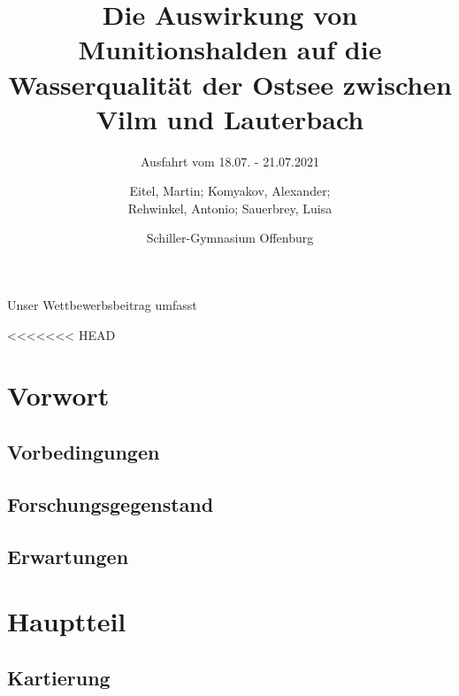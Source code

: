 \documentclass[12pt,titlepage]{scrreprt}
\begin{document}
% 
\begin{titlepage}

	

\title{Die Auswirkung von Munitionshalden auf die Wasserqualität der Ostsee zwischen Vilm und Lauterbach}
\subtitle{Ausfahrt vom 18.07. - 21.07.2021}
\titlehead{\centering\texttt{[image: Bilder/DSC05220]}}


\author{Eitel, Martin; Komyakov, Alexander; \\ Rehwinkel, Antonio; Sauerbrey, Luisa\\ \and Schiller-Gymnasium Offenburg}

\publishers{Wissenschaftspate: Prof Dr. Jens Greinert \texttt{jgreinert@geomar.de} \\
\vspace*{2ex} Betreuer: Marek Czernohous \texttt{m.czernohous@schiller-offenburg.de}}

\maketitle

\end{titlepage}
Unser Wettbewerbsbeitrag umfasst

\tableofcontents
<<<<<<< HEAD

\chapter{Vorwort}
\section{Vorbedingungen}
\section{Forschungsgegenstand}
\section{Erwartungen}
\chapter{Hauptteil}
\section{Kartierung}
\end{document}
